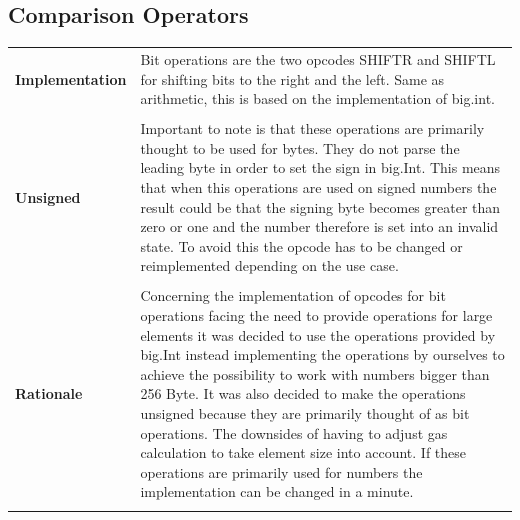 \subsection{Comparison Operators}
\begin{tabular}[t]{ p{3cm} p{12.5cm}}
\raggedright
\textbf{Implementation} & 
Bit operations are the two opcodes SHIFTR and SHIFTL for shifting bits to the right and the left. Same as arithmetic, this is based on the implementation of big.int. \\ \\

\raggedright
\textbf{Unsigned} & 
Important to note is that these operations are primarily thought to be used for bytes. They do not parse the leading byte in order to set the sign in big.Int. This means that when this operations are used on signed numbers the result could be that the signing byte becomes greater than zero or one and the number therefore is set into an invalid state. To avoid this the opcode has to be changed or reimplemented depending on the use case. \\ \\

\raggedright
\textbf{Rationale} & 
Concerning the implementation of opcodes for bit operations facing the need to provide operations for large elements it was decided to use the operations provided by big.Int instead implementing the operations by ourselves to achieve the possibility to work with numbers bigger than 256 Byte. It was also decided to make the operations unsigned because they are primarily thought of as bit operations. The downsides of having to adjust gas calculation to take element size into account. If these operations are primarily used for numbers the implementation can be changed in a minute. \\ \\
\end{tabular}

